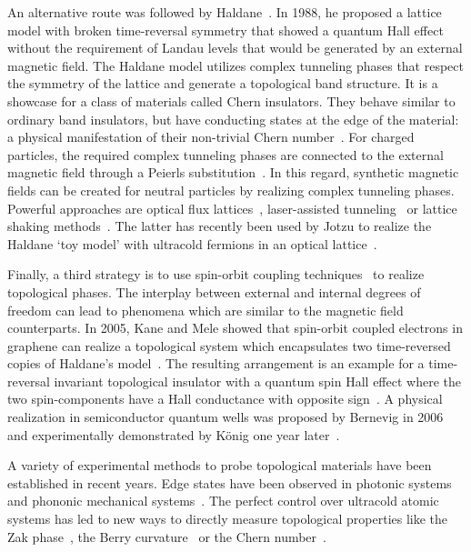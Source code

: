 An alternative route was followed by Haldane~\cite{Haldane1988}.
In 1988, he proposed a lattice model with broken time-reversal symmetry that showed a quantum Hall effect without the requirement of Landau levels that would be generated by an external magnetic field.
The Haldane model utilizes complex tunneling phases that respect the symmetry of the lattice and generate a topological band structure.
It is a showcase for a class of materials called Chern insulators.
They behave similar to ordinary band insulators, but have conducting states at the edge of the material: a physical manifestation of their non-trivial Chern number~\cite{Hatsugai1993}.
For charged particles, the required complex tunneling phases are connected to the external magnetic field through a Peierls substitution~\cite{Peierls1933}.
In this regard, synthetic magnetic fields can be created for neutral particles by realizing complex tunneling phases.
Powerful approaches are optical flux lattices~\cite{Cooper2011}, laser-assisted tunneling~\cite{Aidelsburger2011,Aidelsburger2013,Miyake2013,Kennedy2015} or lattice shaking methods~\cite{Struck2012,Struck2013}.
The latter has recently been used by Jotzu \etal to realize the Haldane `toy model' with ultracold fermions in an optical lattice~\cite{Jotzu2014}.

Finally, a third strategy is to use spin-orbit coupling techniques~\cite{Lin2011,Cheuk2012,Wang2012,Hamner2014,Jimenez-Garcia2015} to realize topological phases.
The interplay between external and internal degrees of freedom can lead to phenomena which are similar to the magnetic field counterparts.
In 2005, Kane and Mele showed that spin-orbit coupled electrons in graphene can realize a topological system which encapsulates two time-reversed copies of Haldane's model~\cite{Kane2005a,Kane2005}.
The resulting arrangement is an example for a time-reversal invariant topological insulator with a quantum spin Hall effect where the two spin-components have a Hall conductance with opposite sign~\cite{Qi2011,Hasan2010}.
A physical realization in semiconductor quantum wells was proposed by Bernevig \etal in 2006~\cite{Bernevig2006a,Bernevig2006b} and experimentally demonstrated by König \etal one year later~\cite{Konig2007}.

A variety of experimental methods to probe topological materials have been established in recent years.
Edge states have been observed in photonic systems~\cite{Hafezi2011a,Hafezi2013,Rechtsman2013} and phononic mechanical systems~\cite{Susstrunk2015}.
The perfect control over ultracold atomic systems has led to new ways to directly measure topological properties like the Zak phase~\cite{Atala2013}, the Berry curvature~\cite{Duca2014} or the Chern number~\cite{Aidelsburger2014}.

